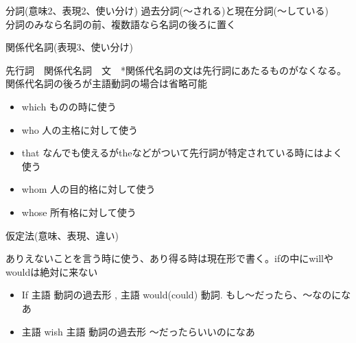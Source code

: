 \documentclass[10pt]{jsarticle}
\newcommand{\answer}[2]{{\color{orange}#2}}
\newcommand{\answer}[2]{\vspace{#1mm}}
\begin{document}
\begin{itembox}[l]{分詞(意味2、表現2、使い分け)}
	\answer{20}{過去分詞(〜される)と現在分詞(〜している)\\
	分詞のみなら名詞の前、複数語なら名詞の後ろに置く}
	\end{itembox}

\begin{itembox}[l]{関係代名詞(表現3、使い分け)}
		\answer{20}{
		先行詞　関係代名詞　文　*関係代名詞の文は先行詞にあたるものがなくなる。\\
		関係代名詞の後ろが主語動詞の場合は省略可能
		\begin{itemize}
			\item which  ものの時に使う
			\item who 人の主格に対して使う
			\item that なんでも使えるがtheなどがついて先行詞が特定されている時にはよく使う
			\item whom 人の目的格に対して使う
			\item whose 所有格に対して使う
		\end{itemize}
	}
\end{itembox}

\begin{itembox}[l]{仮定法(意味、表現、違い)}
	\answer{10}{
	ありえないことを言う時に使う、あり得る時は現在形で書く。ifの中にwillやwouldは絶対に来ない
	\begin{itemize}
	\item If 主語 動詞の過去形 , 主語 would(could) 動詞. もし〜だったら、〜なのになあ
	\item 主語 wish 主語 動詞の過去形  〜だったらいいのになあ
	\end{itemize}
	}
\end{itembox}

\newpage
\end{document}
